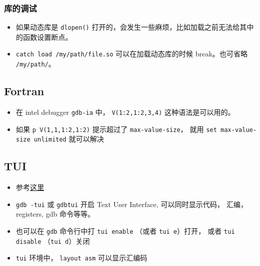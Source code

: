 \subsubsection{库的调试}
\begin{itemize}
\item 如果动态库是 \verb`dlopen()` 打开的，会发生一些麻烦，比如加载之前无法给其中的函数设置断点。
\item \verb`catch load /my/path/file.so` 可以在加载动态库的时候 break。也可省略 \verb`/my/path/`。
\end{itemize}

\subsection{Fortran}
\begin{itemize}
\item 在 intel debugger \verb`gdb-ia` 中， \verb`V(1:2,1:2,3,4)` 这种语法是可以用的。
\item 如果 \verb`p V(1,1,1:2,1:2)` 提示超过了 \verb`max-value-size`， 就用 \verb`set max-value-size unlimited` 就可以解决
\end{itemize}

\subsection{TUI}
\begin{itemize}
\item 参考\href{https://developer.apple.com/library/archive/documentation/DeveloperTools/gdb/gdb/gdb_toc.html#TOC229}{这里}
\item \verb`gdb -tui` 或 \verb`gdbtui` 开启 Text User Interface, 可以同时显示代码， 汇编， registers, gdb 命令等等。
\item 也可以在 \verb`gdb` 命令行中打 \verb`tui enable` （或者 \verb`tui e`）打开， 或者 \verb`tui disable` （\verb`tui d`）关闭
\item \verb`tui` 环境中， \verb`layout asm` 可以显示汇编码
\end{itemize}


